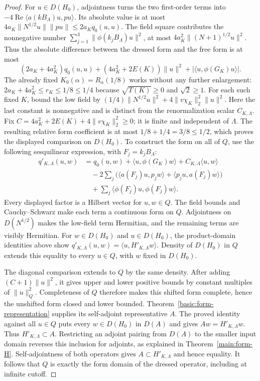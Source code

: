\documentclass[11pt,a4paper]{article}
\theoremstyle{definition}
\theoremstyle{remark}
\begin{document}
\begin{proof}
For $u\in D(H_0)$, adjointness turns the two first-order terms into
$-4\operatorname{Re}\langle a(kB_\Lambda)u,pu\rangle$. Its absolute
value is at most
$4a_K\|N^{1/2}u\|\|pu\|\leq2a_Kq_0(u,u)$.
The field square contributes the nonnegative number
$\sum_{j=1}^3\|\phi(k_jB_\Lambda)u\|^2$, at most
$4a_K^2\|(N+1)^{1/2}u\|^2$. Thus the absolute difference between
the dressed form and the free form is at most
\[
 (2a_K+4a_K^2)q_0(u,u)+(4a_K^2+2E(K))\|u\|^2
                       +|\langle u,\phi(G_K)u\rangle|.
\]
The already fixed $K_0(\alpha)=R_\alpha(1/8)$ works without
any further enlargement: $2a_K+4a_K^2\leq r_K\leq1/8\leq1/4$
because $\sqrt{T(K)}\geq0$ and $\sqrt2\geq1$.
For each such fixed $K$, bound the low field by
$(1/4)\|N^{1/2}u\|^2+4\|v\chi_K\|_2^2\|u\|^2$.
Here the last constant is nonnegative and is distinct from the
renormalization scalar $C_{K,\Lambda}$. Fix
$C=4a_K^2+2E(K)+4\|v\chi_K\|_2^2\geq0$; it is finite
and independent of $\Lambda$. The resulting relative form
coefficient is at most $1/8+1/4=3/8\leq1/2$, which proves
the displayed comparison on $D(H_0)$. To construct the
form on all of $Q$, use the following sesquilinear expression, with
$F_j=k_jB_\Lambda$:
\begin{align*}
 q'_{K,\Lambda}(u,w)
 &=q_0(u,w)+\langle u,\phi(G_K)w\rangle+C_{K,\Lambda}\langle u,w\rangle\\
 &\quad-2\sum_j\bigl(\langle a(F_j)u,p_jw\rangle
                  +\langle p_ju,a(F_j)w\rangle\bigr)\\
 &\quad+\sum_j\langle\phi(F_j)u,\phi(F_j)w\rangle.
\end{align*}
Every displayed factor is a Hilbert vector for $u,w\in Q$.
The field bounds and Cauchy--Schwarz make each term a continuous form
on $Q$. Adjointness on $D(N^{1/2})$ makes the low-field term
Hermitian, and the remaining terms are visibly Hermitian.
For $w\in D(H_0)$ and $u\in D(H_0)$, the product-domain identities
above show
$q'_{K,\Lambda}(u,w)=\langle u,H'_{K,\Lambda}w\rangle$.
Density of $D(H_0)$ in $Q$ extends this equality to every $u\in Q$,
with $w$ fixed in $D(H_0)$.

The diagonal comparison extends to $Q$ by the same density. After
adding $(C+1)\|u\|^2$, it gives upper and lower positive bounds by
constant multiples of $\|u\|_Q^2$. Completeness of $Q$ therefore
makes this shifted form complete, hence the unshifted form closed
and lower bounded. Theorem~\ref{basic:form-representation} supplies
its self-adjoint representative $A$. The proved identity against
all $u\in Q$ puts every $w\in D(H_0)$ in $D(A)$ and gives
$Aw=H'_{K,\Lambda}w$. Thus $H'_{K,\Lambda}\subset A$.
Restricting an adjoint pairing from $D(A)$ to the smaller input
domain reverses this inclusion for adjoints, as explained in
Theorem~\ref{main:form-H}. Self-adjointness of both operators gives $A\subset H'_{K,\Lambda}$ and hence equality.
It follows that $Q$ is exactly the form domain of the dressed
operator, including at infinite cutoff.


\end{proof}
\end{document}
